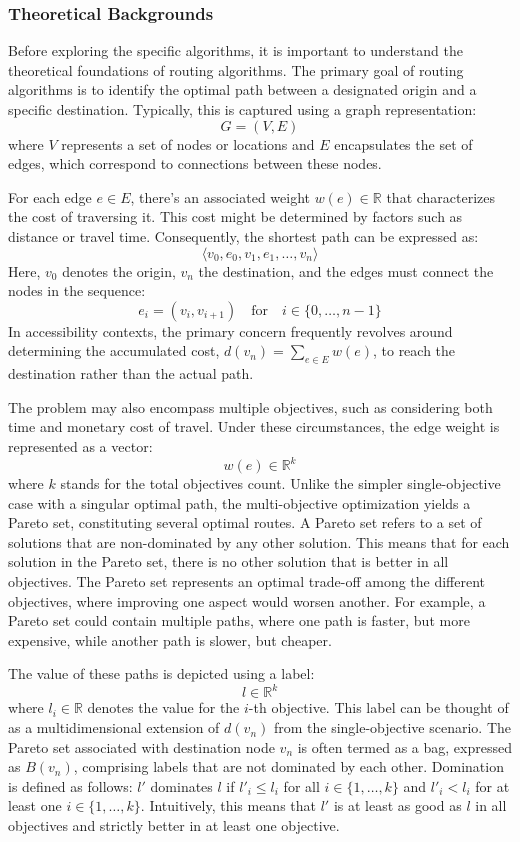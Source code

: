 \subsubsection{Theoretical Backgrounds}

Before exploring the specific algorithms, it is important to understand the theoretical foundations of routing algorithms.
The primary goal of routing algorithms is to identify the optimal path between a designated origin and a specific destination.
Typically, this is captured using a graph representation:
\[ G = (V, E) \]
where $V$ represents a set of nodes or locations and $E$ encapsulates the set of edges, which correspond to connections between these nodes.

For each edge \( e \in E \), there's an associated weight \( w(e) \in \mathbb{R} \) that characterizes the cost of traversing it.
This cost might be determined by factors such as distance or travel time.
Consequently, the shortest path can be expressed as:
\[ \langle v_0, e_0, v_1, e_1, \dots, v_n \rangle \]
Here, \( v_0 \) denotes the origin, \( v_n \) the destination, and the edges must connect the nodes in the sequence:
\[ e_i = (v_i, v_{i+1}) \quad \text{for} \quad i \in \{0, \dots, n-1\} \]
In accessibility contexts, the primary concern frequently revolves around determining the accumulated cost, \( d(v_n) = \sum_{e \in E} w(e) \), to reach the destination rather than the actual path.

The problem may also encompass multiple objectives, such as considering both time and monetary cost of travel.
Under these circumstances, the edge weight is represented as a vector:
\[ w(e) \in \mathbb{R}^k \]
where \( k \) stands for the total objectives count.
Unlike the simpler single-objective case with a singular optimal path, the multi-objective optimization yields a Pareto set, constituting several optimal routes.
A Pareto set refers to a set of solutions that are non-dominated by any other solution.
This means that for each solution in the Pareto set, there is no other solution that is better in all objectives.
The Pareto set represents an optimal trade-off among the different objectives, where improving one aspect would worsen another.
For example, a Pareto set could contain multiple paths, where one path is faster, but more expensive, while another path is slower, but cheaper.

The value of these paths is depicted using a label:
\[ l \in \mathbb{R}^k \]
where \( l_i \in \mathbb{R} \) denotes the value for the \( i \)-th objective.
This label can be thought of as a multidimensional extension of \( d(v_n) \) from the single-objective scenario.
The Pareto set associated with destination node \( v_n \) is often termed as a bag, expressed as \( B(v_n) \), comprising labels that are not dominated by each other.
Domination is defined as follows: \( l' \) dominates \( l \) if \( l'_i \leq l_i \) for all \( i \in \{1, \dots, k\} \) and \( l'_i < l_i \) for at least one \( i \in \{1, \dots, k\} \).
Intuitively, this means that \( l' \) is at least as good as \( l \) in all objectives and strictly better in at least one objective.

